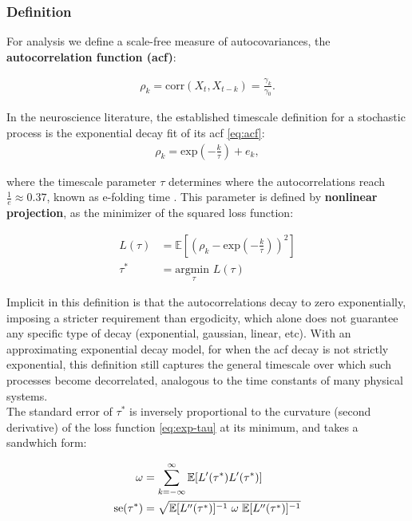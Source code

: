 \documentclass[main.tex]{subfiles}
\begin{document}
\subsubsection{Definition}
For analysis we define a scale-free measure of autocovariances, the \textbf{autocorrelation function (acf)}:

\begin{align} \label{eq:acf}
\rho_k = \text{corr}(X_t, X_{t-k}) = \frac{\gamma_k}{\gamma_0}.
\end{align}



In the neuroscience literature, the established timescale definition for a stochastic process is the exponential decay fit of its acf \eqref{eq:acf}:
\begin{align}\label{eq:exp}
    \rho_k = \text{exp}(-\frac{k}{\tau}) + e_k,
\end{align}

where the timescale parameter $\tau$ determines where the autocorrelations reach $\frac{1}{e} \approx 0.37$, known as e-folding time \cite{murray_hierarchy_2014}. This parameter is defined by \textbf{nonlinear projection}, as the minimizer of the squared loss function:

\begin{align}
    L(\tau) &= \mathbb{E}[(\rho_k - \text{exp}(-\frac{k}{\tau}))^2]\\
    \tau^* &= \underset{\tau}{\text{argmin }} L(\tau) \label{eq:exp-tau}
\end{align}

Implicit in this definition is that the autocorrelations decay to zero exponentially, imposing a stricter requirement than ergodicity, which alone does not guarantee any specific type of decay (exponential, gaussian, linear, etc). With an approximating exponential decay model, for when the acf decay is not strictly exponential, this definition still captures the general timescale over which such processes become decorrelated, analogous to the time constants of many physical systems.\\


The standard error of $\tau^*$ is inversely proportional to the curvature (second derivative) of the loss function \eqref{eq:exp-tau} at its minimum, and takes a sandwhich form:

\begin{align}
    \omega &= \sum_{k=-\infty}^\infty \mathbb{E}[L'(\tau^*) L'(\tau^*)]\\
    \text{se}(\tau^*) &= \sqrt{\mathbb{E}[L''(\tau^*)]^{-1} \hspace{3px} \omega \hspace{3px} \mathbb{E}[L''(\tau^*)]^{-1}}
\end{align}
\end{document}
